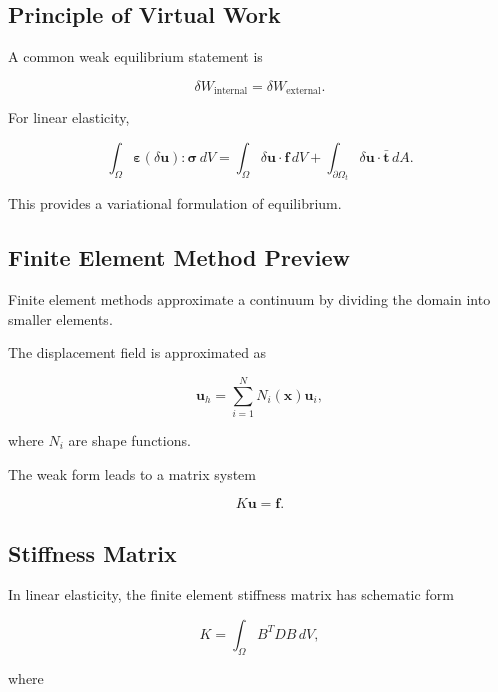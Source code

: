 \subsection{Principle of Virtual Work}
\label{subsec:virtual-work}

A common weak equilibrium statement is

\[
\boxed{
\delta W_{\text{internal}}
=
\delta W_{\text{external}}.
}
\]

For linear elasticity,

\[
\boxed{
\int_\Omega
\boldsymbol{\varepsilon}(\delta\mathbf{u})
:
\boldsymbol{\sigma}
\,dV
=
\int_\Omega
\delta\mathbf{u}\cdot\mathbf{f}
\,dV
+
\int_{\partial\Omega_t}
\delta\mathbf{u}\cdot\bar{\mathbf{t}}
\,dA.
}
\]

This provides a variational formulation of equilibrium.

\subsection{Finite Element Method Preview}
\label{subsec:finite-element-continuum-preview}

Finite element methods approximate a continuum by dividing the domain into
smaller elements.

The displacement field is approximated as

\[
\boxed{
\mathbf{u}_h
=
\sum_{i=1}^{N}
N_i(\mathbf{x})\mathbf{u}_i,
}
\]

where \(N_i\) are shape functions.

The weak form leads to a matrix system

\[
\boxed{
K\mathbf{u}
=
\mathbf{f}.
}
\]

\subsection{Stiffness Matrix}
\label{subsec:finite-element-stiffness}

In linear elasticity, the finite element stiffness matrix has schematic form

\[
\boxed{
K
=
\int_\Omega
B^TDB
\,dV,
}
\]

where

